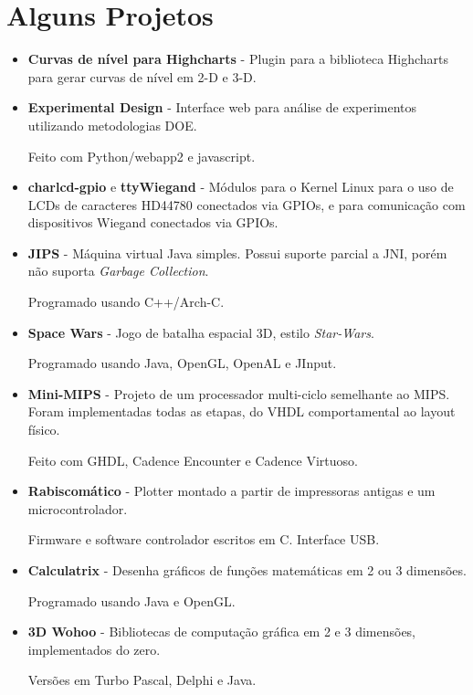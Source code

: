 \documentclass[a4paper,10pt]{article}
\begin{document}
  \section{Alguns Projetos}
    \begin{itemize}
      \item 
        \textbf{Curvas de nível para Highcharts} - Plugin para a biblioteca Highcharts para gerar curvas de nível em 2-D e 3-D.
      
      \item 
        \textbf{Experimental Design} - Interface web para análise de experimentos utilizando metodologias DOE.

        Feito com Python/webapp2 e javascript.
        
      \item 
        \textbf{charlcd-gpio} e \textbf{ttyWiegand} - Módulos para o Kernel Linux para o uso de LCDs de caracteres HD44780 conectados via GPIOs, e para comunicação com dispositivos Wiegand conectados via GPIOs.

      \item 
        \textbf{JIPS} - Máquina virtual Java simples. Possui suporte parcial a JNI, porém não suporta \emph{Garbage Collection}.

        Programado usando C++/Arch-C.

      \item 
        \textbf{Space Wars} - Jogo de batalha espacial 3D, estilo \emph{Star-Wars}.

        Programado usando Java, OpenGL, OpenAL e JInput.

      \item 
        \textbf{Mini-MIPS} - Projeto de um processador multi-ciclo semelhante ao MIPS. Foram implementadas todas as etapas, do VHDL comportamental ao layout físico.

        Feito com GHDL, Cadence Encounter e Cadence Virtuoso.

      \item 
        \textbf{Rabiscomático} - Plotter montado a partir de impressoras antigas e um microcontrolador.

        Firmware e software controlador escritos em C. Interface USB.

      \item 
        \textbf{Calculatrix} - Desenha gráficos de funções matemáticas em 2 ou 3 dimensões.

        Programado usando Java e OpenGL.

      \item 
        \textbf{3D Wohoo} - Bibliotecas de computação gráfica em 2 e 3 dimensões, implementados do zero.

        Versões em Turbo Pascal, Delphi e Java.
    \end{itemize}
\end{document}
